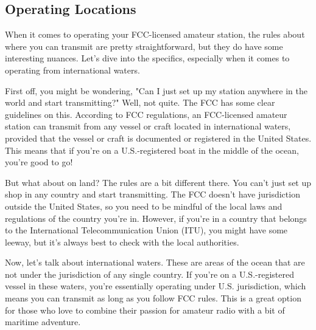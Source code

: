 \subsection{Operating Locations}
\label{subsec:operating-location}

When it comes to operating your FCC-licensed amateur station, the rules about where you can transmit are pretty straightforward, but they do have some interesting nuances. Let's dive into the specifics, especially when it comes to operating from international waters.

First off, you might be wondering, "Can I just set up my station anywhere in the world and start transmitting?" Well, not quite. The FCC has some clear guidelines on this. According to FCC regulations, an FCC-licensed amateur station can transmit from any vessel or craft located in international waters, provided that the vessel or craft is documented or registered in the United States. This means that if you're on a U.S.-registered boat in the middle of the ocean, you're good to go!

But what about on land? The rules are a bit different there. You can't just set up shop in any country and start transmitting. The FCC doesn't have jurisdiction outside the United States, so you need to be mindful of the local laws and regulations of the country you're in. However, if you're in a country that belongs to the International Telecommunication Union (ITU), you might have some leeway, but it's always best to check with the local authorities.

Now, let's talk about international waters. These are areas of the ocean that are not under the jurisdiction of any single country. If you're on a U.S.-registered vessel in these waters, you're essentially operating under U.S. jurisdiction, which means you can transmit as long as you follow FCC rules. This is a great option for those who love to combine their passion for amateur radio with a bit of maritime adventure.



